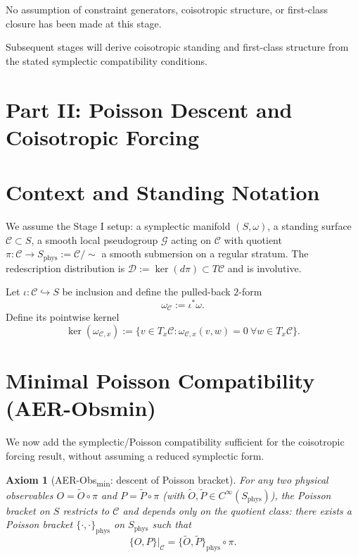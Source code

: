 \documentclass[11pt]{article}
\newtheorem{axiom}[definition]{Axiom}
\theoremstyle{remark}
\theoremstyle{plain}
\begin{document}
No assumption of constraint generators, coisotropic structure,
or first-class closure has been made at this stage.

Subsequent stages will derive coisotropic standing and first-class structure
from the stated symplectic compatibility conditions.



\section*{Part II: Poisson Descent and Coisotropic Forcing}




\section{Context and Standing Notation}

We assume the Stage I setup:
a symplectic manifold $(S,\omega)$, a standing surface $\mathcal{C}\subset S$,
a smooth local pseudogroup $\mathcal{G}$ acting on $\mathcal{C}$ with quotient
$\pi:\mathcal{C}\to S_{\mathrm{phys}}:=\mathcal{C}/\sim$ a smooth submersion on a regular stratum.
The redescription distribution is $\mathcal{D}:=\ker(d\pi)\subset T\mathcal{C}$ and is involutive.

Let $\iota:\mathcal{C}\hookrightarrow S$ be inclusion and define the pulled-back $2$-form
\begin{equation}
\omega_{\mathcal{C}}:=\iota^*\omega.
\end{equation}
Define its pointwise kernel
\begin{equation}
\ker(\omega_{\mathcal{C},x}) := \{v\in T_x\mathcal{C}: \omega_{\mathcal{C},x}(v,w)=0\ \forall w\in T_x\mathcal{C}\}.
\end{equation}

\section{Minimal Poisson Compatibility (AER-Obsmin)}

We now add the symplectic/Poisson compatibility sufficient for the coisotropic forcing result,
without assuming a reduced symplectic form.

\begin{axiom}[AER-Obs\textsubscript{min}: descent of Poisson bracket]
\label{ax:obsmin}
For any two physical observables $O=\tilde O\circ \pi$ and $P=\tilde P\circ \pi$ (with $\tilde O,\tilde P\in C^\infty(S_{\mathrm{phys}})$),
the Poisson bracket on $S$ restricts to $\mathcal{C}$ and depends only on the quotient class:
there exists a Poisson bracket $\{\cdot,\cdot\}_{\mathrm{phys}}$ on $S_{\mathrm{phys}}$ such that
\begin{equation}
\{O,P\}\big|_{\mathcal{C}} = \{\tilde O,\tilde P\}_{\mathrm{phys}}\circ \pi.
\label{eq:poisson-descent}
\end{equation}
\end{axiom}
\end{document}
